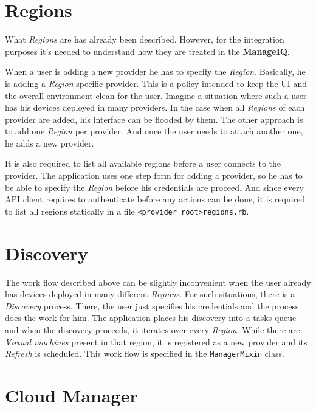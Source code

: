 \section{Regions}
\label{sec:Regions}

What \emph{Regions} are has already been described. However, for the integration purposes it's needed to understand how they are treated in the \textbf{ManageIQ}.

When a user is adding a new provider he has to specify the \emph{Region}. Basically, he is adding a \emph{Region} specific provider. This is a policy intended to keep the UI and the overall environment clean for the user. Imagine a situation where such a user has his devices deployed in many providers. In the case when all \emph{Regions} of each provider are added, his interface can be flooded by them. The other approach is to add one \emph{Region} per provider. And once the user needs to attach another one, he adds a new provider.

It is also required to list all available regions before a user connects to the provider. The application uses one step form for adding a provider, so he has to be able to specify the \emph{Region} before his credentials are proceed. And since every API client requires to authenticate before any actions can be done, it is required to list all regions statically in a file \verb|<provider_root>regions.rb|.

\section{Discovery}
\label{sec:Discovery}

The work flow described above can be slightly inconvenient when the user already has devices deployed in many different \emph{Regions}. For such situations, there is a \emph{Discovery} process. There, the user just specifies his credentials and the process does the work for him. The application places his discovery into a tasks queue and when the discovery proceeds, it iterates over every \emph{Region}. While there are \emph{Virtual machines} present in that region, it is registered as a new provider and its \emph{Refresh} is scheduled. This work flow is specified in the \verb|ManagerMixin| class.

\section{Cloud Manager}
\label{sec:Cloud Manager}

